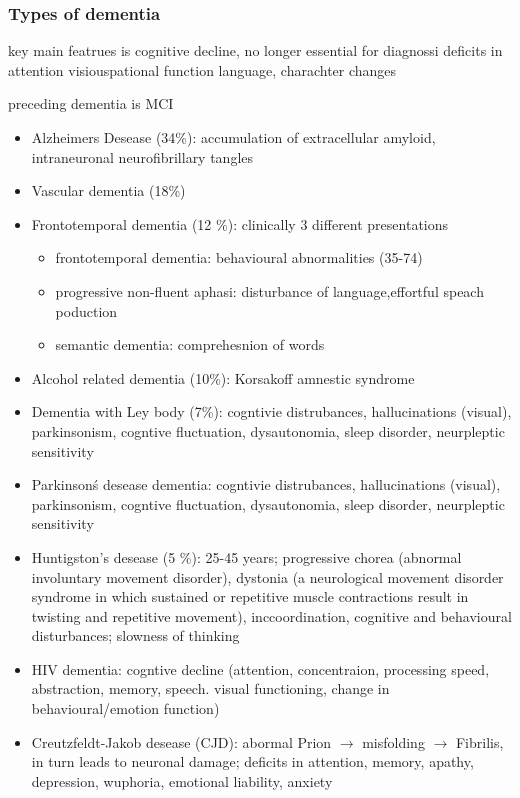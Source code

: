 \documentclass[fleqn]{article}\usepackage{caption}
\begin{document}
\subsubsection{Types of dementia}
key main featrues is cognitive decline, no longer essential for diagnossi
deficits in attention
visiouspational function 
language, charachter changes

preceding dementia is MCI
\begin{itemize}
\item Alzheimers Desease (34\%): accumulation of extracellular amyloid, intraneuronal neurofibrillary tangles
\item Vascular dementia (18\%)
\item Frontotemporal dementia (12 \%): clinically 3 different presentations 
\begin{itemize}
\item frontotemporal dementia: behavioural abnormalities (35-74)
\item progressive non-fluent aphasi: disturbance of language,effortful speach poduction
\item semantic dementia: comprehesnion of words
\end{itemize}
\item Alcohol related dementia (10\%): Korsakoff amnestic syndrome
\item Dementia with Ley body (7\%): cogntivie distrubances, hallucinations (visual), parkinsonism, cogntive fluctuation, dysautonomia, sleep disorder, neurpleptic sensitivity
\item Parkinson\'s desease dementia: cogntivie distrubances, hallucinations (visual), parkinsonism, cogntive fluctuation, dysautonomia, sleep disorder, neurpleptic sensitivity
\item Huntigston's desease (5 \%):  25-45 years; progressive chorea (abnormal involuntary movement disorder), dystonia (a neurological movement disorder syndrome in which sustained or repetitive muscle contractions result in twisting and repetitive movement), inccoordination, cognitive and behavioural disturbances; slowness of thinking
\item HIV dementia: cogntive decline (attention, concentraion, processing speed, abstraction, memory, speech. visual functioning, change in behavioural/emotion function)
\item Creutzfeldt-Jakob desease (CJD): abormal Prion $\rightarrow$ misfolding $\rightarrow$ Fibrilis, in turn leads to neuronal damage; deficits in attention, memory, apathy, depression, wuphoria, emotional liability, anxiety
\end{itemize}
\end{document}
